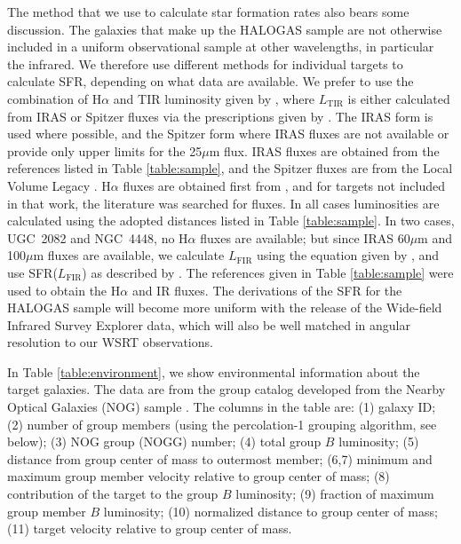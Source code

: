 \documentclass[oldversion]{aa}
\begin{document}
The method that we use to calculate star formation rates also bears some discussion. The galaxies that make up the HALOGAS sample are not otherwise included in a uniform observational sample at other wavelengths, in particular the infrared. We therefore use different methods for individual targets to calculate SFR, depending on what data are available. We prefer to use the combination of H$\alpha$ and TIR luminosity given by \citet{kennicutt_etal_2009}, where $L_{\mathrm{TIR}}$ is either calculated from IRAS or Spitzer fluxes via the prescriptions given by \citet{dale_helou_2002}. The IRAS form is used where possible, and the Spitzer form where IRAS fluxes are not available or provide only upper limits for the 25$\mu$m flux. IRAS fluxes are obtained from the references listed in Table \ref{table:sample}, and the Spitzer fluxes are from the Local Volume Legacy \citep[LVL;][]{dale_etal_2009}. H$\alpha$ fluxes are obtained first from \citet{kennicutt_etal_2008}, and for targets not included in that work, the literature was searched for fluxes. In all cases luminosities are calculated using the adopted distances listed in Table \ref{table:sample}. In two cases, UGC~2082 and NGC~4448, no H$\alpha$ fluxes are available; but since IRAS 60$\mu$m and 100$\mu$m fluxes are available, we calculate $L_{\mathrm{FIR}}$ using the equation given by \citet{rice_etal_1988}, and use SFR($L_{\mathrm{FIR}}$) as described by \citet{kennicutt_1998}. The references given in Table \ref{table:sample} were used to obtain the H$\alpha$ and IR fluxes. The derivations of the SFR for the HALOGAS sample will become more uniform with the release of the Wide-field Infrared Survey Explorer \citep[WISE;][]{wright_2008} data, which will also be well matched in angular resolution to our WSRT observations.

In Table \ref{table:environment}, we show environmental information about the target galaxies. The data are from the group catalog developed from the Nearby Optical Galaxies (NOG) sample \citep{giuricin_etal_2000}. The columns in the table are: (1) galaxy ID; (2) number of group members (using the percolation-1 grouping algorithm, see below); (3) NOG group (NOGG) number; (4) total group $B$ luminosity; (5) distance from group center of mass to outermost member; (6,7) minimum and maximum group member velocity relative to group center of mass; (8) contribution of the target to the group $B$ luminosity; (9) fraction of maximum group member $B$ luminosity; (10) normalized distance to group center of mass; (11) target velocity relative to group center of mass.
\end{document}
